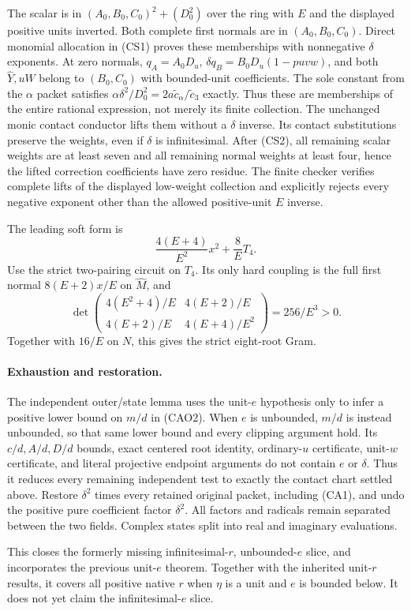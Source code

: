 The scalar is in
$(A_0,B_0,C_0)^2+(D_0^2)$ over the ring with $E$ and the displayed
positive units inverted. Both complete first normals are in
$(A_0,B_0,C_0)$. Direct monomial allocation in (CS1) proves these
memberships with nonnegative $\delta$ exponents. At zero normals,
$q_A=A_0D_u$, $\delta q_B=B_0D_u(1-puv w)$, and both
$\widehat Y,u\widehat W$ belong to $(B_0,C_0)$ with bounded-unit
coefficients. The sole constant from the $\alpha$ packet satisfies
$\alpha\delta^2/D_0^2=2a\widetilde c_\alpha/\widetilde c_3$ exactly.
Thus these are memberships of the entire rational expression, not merely
its finite collection. The unchanged monic
contact conductor lifts them without a $\delta$ inverse. Its contact
substitutions preserve the weights, even if $\delta$ is infinitesimal.
After (CS2), all remaining scalar weights are at least seven and all
remaining normal weights at least four, hence the lifted correction
coefficients have zero residue. The finite checker verifies complete lifts of the displayed low-weight
collection and explicitly rejects every negative exponent other
than the allowed positive-unit $E$ inverse.

The leading soft form is
\[
            \frac{4(E+4)}{E^2}x^2+\frac8E T_4.
\]
Use the strict two-pairing circuit on $T_4$. Its only hard coupling
is the full first normal $8(E+2)x/E$ on $\widehat M$, and
\[
 \det\begin{pmatrix}4(E^2+4)/E&4(E+2)/E\\
                    4(E+2)/E&4(E+4)/E^2\end{pmatrix}
                   =256/E^3>0.                       \tag{CS4}
\]
Together with $16/E$ on $N$, this gives the strict eight-root Gram.

\paragraph{Exhaustion and restoration.}
The independent outer/state lemma 
uses the unit-$e$ hypothesis only to infer a positive lower bound on
$m/d$ in (CAO2). When $e$ is unbounded, $m/d$ is instead unbounded,
so that same lower bound and every clipping argument hold. Its
$c/d,A/d,D/d$ bounds, exact centered root identity, ordinary-$u$
certificate, unit-$w$ certificate, and literal projective endpoint
arguments do not contain $e$ or $\delta$. Thus it reduces every
remaining independent test to exactly the contact chart settled above.
Restore $\delta^2$ times every retained original packet, including
(CA1), and undo the positive pure coefficient factor $\delta^2$.
All factors and radicals remain separated between the two fields.
Complex states split into real and imaginary evaluations.

This closes the formerly missing infinitesimal-$r$, unbounded-$e$
slice, and incorporates the previous unit-$e$ theorem. Together with
the inherited unit-$r$ results, it covers all positive native $r$
when $\eta$ is a unit and $e$ is bounded below. It does not yet
claim the infinitesimal-$e$ slice.

